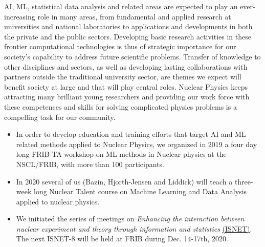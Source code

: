 \documentclass[%
10pt]{article}
\begin{document}
AI, ML, statistical data analysis and related areas are expected to
play an ever-increasing role in many areas, from fundamental and
applied research at universities and national laboratories to
applications and developments in both the private and the public
sectors.
Developing basic research activities in these frontier
computational technologies is thus of strategic importance for our
society’s capability to address future scientific problems. Transfer
of knowledge to other disciplines and sectors, as well as developing
lasting collaborations with partners outside the traditional
university sector, are themes we expect will benefit society at large
and that will play central roles. Nuclear Physics keeps attracting many brilliant young researchers and providing our work force with these competences and skills for solving complicated physics problems is a compelling task for our community.


\begin{itemize}

\item In order to develop education and training efforts that target AI and ML related methods applied to Nuclear Physics, we  organized in 2019 a four day long  FRIB-TA workshop on ML methods in Nuclear physics at the NSCL/FRIB, with more than 100 participants.

\item In 2020 several of us (Bazin, Hjorth-Jensen and Liddick) will teach a three-week long Nuclear Talent course on Machine Learning and Data Analysis applied to nuclear physics. 

\item
We initiated the series of meetings on {\it Enhancing the interaction between nuclear experiment and theory through information and statistics} \href{https://iopscience.iop.org/journal/0954-3899/page/ISNET}{(ISNET)}.  The next ISNET-8 will be held at FRIB during  Dec. 14-17th, 2020.

\end{itemize}
\end{document}
